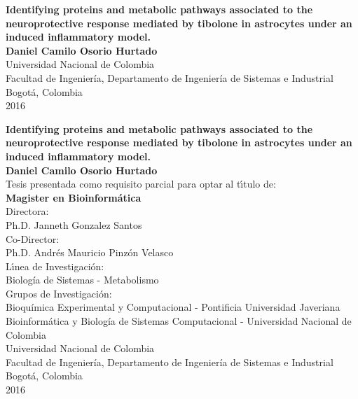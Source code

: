 \begin{center}
\begin{figure}
\centering%
%
\end{figure}
\thispagestyle{empty} \vspace*{2.0cm} \textbf{\huge
Identifying proteins and metabolic pathways associated to the neuroprotective response mediated by tibolone in astrocytes under an induced inflammatory model.}\\[3.0cm]
\Large\textbf{Daniel Camilo Osorio Hurtado}\\[6.0cm]
\small Universidad Nacional de Colombia\\
Facultad de Ingeniería, Departamento de Ingeniería de Sistemas e Industrial\\
Bogotá, Colombia\\
2016\\
\end{center}

\newpage{\pagestyle{empty}\cleardoublepage}

\newpage
\begin{center}
\thispagestyle{empty} \vspace*{0cm} \textbf{\huge
Identifying proteins and metabolic pathways associated to the neuroprotective response mediated by tibolone in astrocytes under an induced inflammatory model.}\\[2.0cm]
\Large\textbf{Daniel Camilo Osorio Hurtado}\\[2.0cm]
\small Tesis presentada como requisito parcial para optar al
t\'{\i}tulo de:\\
\textbf{Magister en Bioinformática}\\[1.5cm]
Directora:\\
Ph.D. Janneth Gonzalez Santos\\[0.7cm]
Co-Director:\\
Ph.D. Andrés Mauricio Pinzón Velasco\\[1.5cm]
L\'{\i}nea de Investigaci\'{o}n:\\
Biolog\'ia de Sistemas - Metabolismo \\
Grupos de Investigaci\'{o}n:\\
Bioquímica Experimental y Computacional - Pontificia Universidad Javeriana \\
Bioinformática y Biología de Sistemas Computacional - Universidad Nacional de Colombia\\[1.7cm]
Universidad Nacional de Colombia\\
Facultad de Ingeniería, Departamento de Ingeniería de Sistemas e Industrial\\
Bogotá, Colombia\\
2016
\end{center}